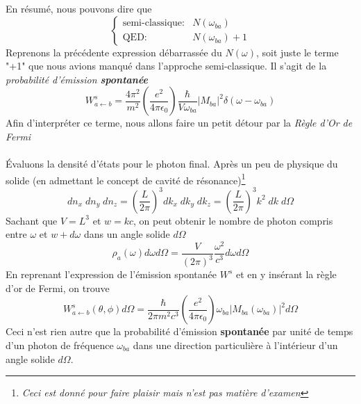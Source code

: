 En résumé, nous pouvons dire que
\begin{equation}
\left\{\begin{array}{ll}
\mbox{semi-classique:} & N(\omega_{ba}) \\
\mbox{QED:} & N(\omega_{ba}) + 1
\end{array} \right.
\end{equation}
Reprenons la précédente expression débarrassée du $N(\omega)$, soit juste le terme "+1" que nous
avions manqué dans l'approche semi-classique. Il s'agit de la \textit{probabilité d'émission
\textbf{spontanée}}
\begin{equation}
W_{a \leftarrow b}^s =
 \frac{4 \pi ^2}{m^2 } \left( \frac{e^2}{4 \pi \epsilon_0 } \right)
\frac{\hbar }{V \omega_{ba} } \vert M_{ba} \vert ^2
  \delta(\omega - \omega_{ba} )
\end{equation}
Afin d'interpréter ce terme, nous allons faire un petit détour par la \textit{Règle d'Or de Fermi}\\

\ \\

Évaluons la densité d'états pour le photon final. Après un peu de physique du solide (en admettant
le concept de cavité de résonance)\footnote{\textit{Ceci est donné pour faire plaisir mais n'est
pas matière d'examen}}
\begin{equation}
dn_x \; dn_y \; dn_z = \left( \frac{L}{2 \pi}  \right) ^3
dk_x \; dk_y \; dk_z
 = \left( \frac{L}{2 \pi}  \right) ^3
k^2 \; dk \; d\Omega
\end{equation}
Sachant que $V=L^3$ et $w=kc$, on peut obtenir le nombre de photon compris entre $\omega$ et 
$w+d\omega$ dans un angle solide $d\Omega$
\begin{equation}
\rho_a (\omega) d \omega d \Omega = \frac{V}{(2 \pi)^3}
\frac{\omega^2}{c^3} d \omega d \Omega 
\end{equation}
En reprenant l'expression de l'émission spontanée $W^s$ et en y insérant la règle d'or de Fermi, 
on trouve
\begin{equation}
W_{a \leftarrow b}^s(\theta,\phi) d \Omega = 
\frac{\hbar}{ 2 \pi m^2 c^3} \left( \frac{e^2}{4 \pi \epsilon_0 } \right)
 \omega_{ba} \vert M_{ba} (\omega_{ba}) \vert ^2
d \Omega
\end{equation}
Ceci n'est rien autre que la probabilité d'émission \textbf{spontanée} par unité de temps d'un photon
de fréquence $\omega_{ba}$ dans une direction particulière à l'intérieur d'un angle solide $d\Omega$.


